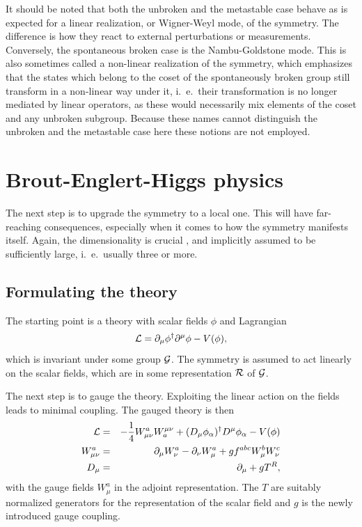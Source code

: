 \documentclass[final,twoside,12pt]{article}
\newcommand*{\La}{{\cal{L}}}
\newcommand*{\no}{\noindent}
\newcommand*{\bea}{\begin{eqnarray}}
\newcommand*{\eea}{\end{eqnarray}}
\newcommand*{\be}{\begin{equation}}
\newcommand*{\ee}{\end{equation}}
\newcommand*{\pd}{\partial}
\newcommand*{\pdm}{\pd_{\mu}}
\newcommand*{\pdn}{\pd_{\nu}}
\newcommand*{\mn}{{\mu\nu}}
\newcommand*{\nn}{\nonumber}
\newcommand*{\1}{1\!\!\!\bot}
\begin{document}
It should be noted that both the unbroken and the metastable case behave as is expected for a linear realization, or Wigner-Weyl mode, of the symmetry. The difference is how they react to external perturbations or measurements. Conversely, the spontaneous broken case is the Nambu-Goldstone mode. This is also sometimes called a non-linear realization of the symmetry, which emphasizes that the states which belong to the coset of the spontaneously broken group still transform in a non-linear way under it, i.\ e.\ their transformation is no longer mediated by linear operators, as these would necessarily mix elements of the coset and any unbroken subgroup. Because these names cannot distinguish the unbroken and the metastable case here these notions are not employed.

\section{Brout-Englert-Higgs physics}\label{s:beh}

The next step is to upgrade the symmetry to a local one. This will have far-reaching consequences, especially when it comes to how the symmetry manifests itself. Again, the dimensionality is crucial \cite{Kennedy:1985yn,Kennedy:1986ut}, and implicitly assumed to be sufficiently large, i.\ e.\ usually three or more.

\subsection{Formulating the theory}\label{s:local}

The starting point is a theory with scalar fields $\phi$ and Lagrangian
\be
\La=\pdm\phi^\dagger\pd^\mu\phi-V(\phi)\nn,
\ee
\no which is invariant under some group ${\cal G}$. The symmetry is assumed to act linearly on the scalar fields, which are in some representation ${\cal R}$ of ${\cal G}$.

The next step is to gauge the theory. Exploiting the linear action on the fields leads to minimal coupling. The gauged theory is then
\bea
{\La}&=&-\frac{1}{4}W_\mn^aW^\mn_a+(D_\mu\phi_\alpha)^\dagger D^\mu\phi_\alpha-V(\phi)\label{la:hs}\\
W_\mn^a&=&\pdm W_\nu^a-\pdn W_\mu^a+gf^{abc}W_\mu^b W_\nu^c\nn\\
D_\mu&=&\pdm+gT^R\nn,
\eea
\no with the gauge fields $W_\mu^a$ in the adjoint representation. The $T$ are suitably normalized generators for the representation of the scalar field and $g$ is the newly introduced gauge coupling.
\end{document}
